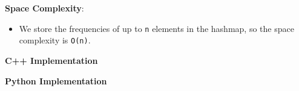 \textbf{Space Complexity}: 
\begin{itemize}
    \item We store the frequencies of up to \texttt{n} elements in the hashmap, so the space complexity is \texttt{O(n)}.
\end{itemize}

\bigskip
\noindent\textbf{C++ Implementation}



\bigskip
\noindent\textbf{Python Implementation}



\ProblemDivider
